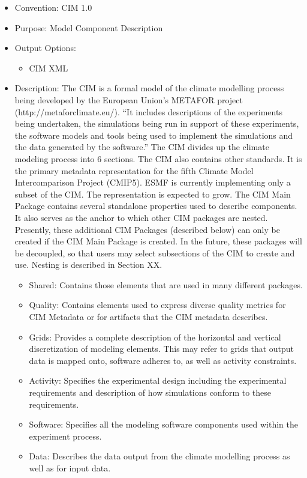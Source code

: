 \begin{itemize}
    \item Convention: CIM 1.0
    \item Purpose: Model Component Description
    \item Output Options: 
    \begin{itemize}
        \item CIM XML
    \end{itemize}  
    \item Description: The CIM is a formal model of the climate modelling process being developed by the European Union's METAFOR project (http://metaforclimate.eu/). ``It includes descriptions of the experiments being undertaken, the simulations being run in support of these experiments, the software models and tools being used to implement the simulations and the data generated by the software.'' The CIM divides up the climate modeling process into 6 sections. The CIM also contains other standards. It is the primary metadata representation for the fifth Climate Model Intercomparison Project (CMIP5). ESMF is currently implementing only a subset of the CIM. The representation is expected to grow. The CIM Main Package contains several standalone properties used to describe components. It also serves as the anchor to which other CIM packages are nested. Presently, these additional CIM Packages (described below) can only be created if the CIM Main Package is created. In the future, these packages will be decoupled, so that users may select subsections of the CIM to create and use. Nesting is described in Section XX. 
    \begin{itemize}
       \item Shared: Contains those elements that are used in many different packages. 
       \item Quality: Contains elements used to express diverse quality metrics for CIM Metadata or for artifacts that the CIM metadata describes.
       \item Grids: Provides a complete description of the horizontal and vertical discretization of modeling elements. This may refer to grids that output data is mapped onto, software adheres to, as well as activity constraints. 
       \item Activity: Specifies the experimental design including the experimental requirements and description of how simulations conform to these requirements.
       \item Software: Specifies all the modeling software components used within the experiment process. 
       \item Data: Describes the data output from the climate modelling process as well as for input data. 
    \end{itemize}
\end{itemize}

